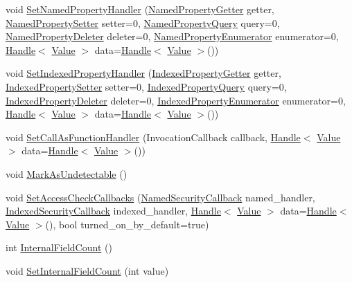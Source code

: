 \begin{DoxyCompactItemize}
\item 
void \hyperlink{classv8_1_1_object_template_aa80e9db593d8b954c4153082dc7a439d}{Set\+Named\+Property\+Handler} (\hyperlink{namespacev8_ab9effde41da1c073eddbd4a11a62bd0b}{Named\+Property\+Getter} getter, \hyperlink{namespacev8_a682b1fc46feab32605c4905612ffe870}{Named\+Property\+Setter} setter=0, \hyperlink{namespacev8_a0136e8102c101d9a39497f75daa9153b}{Named\+Property\+Query} query=0, \hyperlink{namespacev8_a7899471fae82b252750b81f41d5c1e26}{Named\+Property\+Deleter} deleter=0, \hyperlink{namespacev8_acbd04b83708cb5a80e73e0396f176e58}{Named\+Property\+Enumerator} enumerator=0, \hyperlink{classv8_1_1_handle}{Handle}$<$ \hyperlink{classv8_1_1_value}{Value} $>$ data=\hyperlink{classv8_1_1_handle}{Handle}$<$ \hyperlink{classv8_1_1_value}{Value} $>$())
\item 
void \hyperlink{classv8_1_1_object_template_af436aeb8132068d3678246f31515ff5a}{Set\+Indexed\+Property\+Handler} (\hyperlink{namespacev8_abf3be19b5157493da3859987cc50c6ab}{Indexed\+Property\+Getter} getter, \hyperlink{namespacev8_a3ca53e294b9b695b3777af904ca942b6}{Indexed\+Property\+Setter} setter=0, \hyperlink{namespacev8_ac84ffd0beb05009f30378ef45a065edf}{Indexed\+Property\+Query} query=0, \hyperlink{namespacev8_a3a7c18d62a0d1f2d12845051920be592}{Indexed\+Property\+Deleter} deleter=0, \hyperlink{namespacev8_a15ab299eff53946ab483b762a4cb20dc}{Indexed\+Property\+Enumerator} enumerator=0, \hyperlink{classv8_1_1_handle}{Handle}$<$ \hyperlink{classv8_1_1_value}{Value} $>$ data=\hyperlink{classv8_1_1_handle}{Handle}$<$ \hyperlink{classv8_1_1_value}{Value} $>$())
\item 
void \hyperlink{classv8_1_1_object_template_a0132c34bbb52a69d13c54bf325effe6e}{Set\+Call\+As\+Function\+Handler} (Invocation\+Callback callback, \hyperlink{classv8_1_1_handle}{Handle}$<$ \hyperlink{classv8_1_1_value}{Value} $>$ data=\hyperlink{classv8_1_1_handle}{Handle}$<$ \hyperlink{classv8_1_1_value}{Value} $>$())
\item 
void \hyperlink{classv8_1_1_object_template_a7e40ef313b44c2ad336c73051523b4f8}{Mark\+As\+Undetectable} ()
\item 
void \hyperlink{classv8_1_1_object_template_acd0c47ecc715fa1256dc95524a4e8608}{Set\+Access\+Check\+Callbacks} (\hyperlink{namespacev8_ab5cafda0c556bba990c660ce9c904e0d}{Named\+Security\+Callback} named\+\_\+handler, \hyperlink{namespacev8_aebbcc7837753e51112d944ad96520da1}{Indexed\+Security\+Callback} indexed\+\_\+handler, \hyperlink{classv8_1_1_handle}{Handle}$<$ \hyperlink{classv8_1_1_value}{Value} $>$ data=\hyperlink{classv8_1_1_handle}{Handle}$<$ \hyperlink{classv8_1_1_value}{Value} $>$(), bool turned\+\_\+on\+\_\+by\+\_\+default=true)
\item 
int \hyperlink{classv8_1_1_object_template_a43de785d594d8c01b18230b1aa79e31c}{Internal\+Field\+Count} ()
\item 
void \hyperlink{classv8_1_1_object_template_ab63916ac584a76bca8ba541f86ce9fce}{Set\+Internal\+Field\+Count} (int value)
\end{DoxyCompactItemize}
